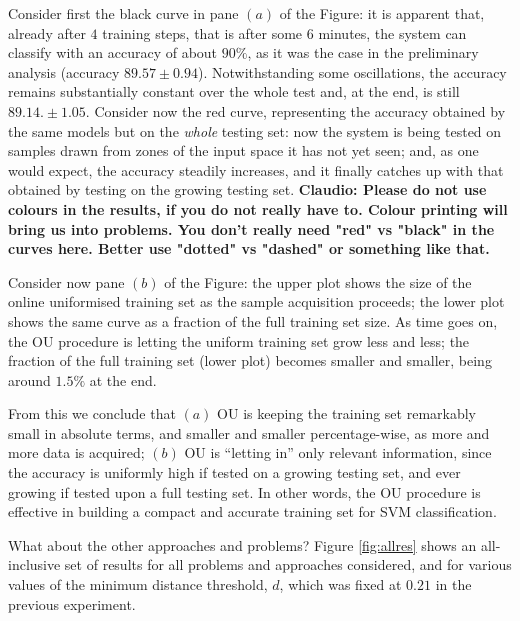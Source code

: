 Consider first the black curve in pane $(a)$ of the Figure: it is
apparent that, already after $4$ training steps, that is after some
$6$ minutes, the system can classify with an accuracy of about $90\%$,
as it was the case in the preliminary analysis (accuracy $89.57 \pm
0.94$). Notwithstanding some oscillations, the accuracy remains
substantially constant over the whole test and, at the end, is still
$89.14. \pm 1.05$. Consider now the red curve, representing the
accuracy obtained by the same models but on the \emph{whole} testing
set: now the system is being tested on samples drawn from zones of the
input space it has not yet seen; and, as one would expect, the
accuracy steadily increases, and it finally catches up with that
obtained by testing on the growing testing set.
\textbf{Claudio:  Please do not use colours in the results, if you do not really have to.  Colour printing will bring us into problems.  You don't really need "red" vs "black"
in the curves here.  Better use "dotted" vs "dashed" or something like that.}

Consider now pane $(b)$ of the Figure: the upper plot shows the size
of the online uniformised training set as the sample acquisition
proceeds; the lower plot shows the same curve as a fraction of the
full training set size. As time goes on, the OU procedure is letting
the uniform training set grow less and less; the fraction of the full
training set (lower plot) becomes smaller and smaller, being around
$1.5\%$ at the end.

From this we conclude that $(a)$ OU is keeping the training set
remarkably small in absolute terms, and smaller and smaller
percentage-wise, as more and more data is acquired; $(b)$ OU is
``letting in'' only relevant information, since the accuracy is
uniformly high if tested on a growing testing set, and ever growing if
tested upon a full testing set. In other words, the OU procedure is
effective in building a compact and accurate training set for SVM
classification.

What about the other approaches and problems? Figure \ref{fig:allres}
shows an all-inclusive set of results for all problems and approaches
considered, and for various values of the minimum distance threshold,
$d$, which was fixed at $0.21$ in the previous experiment.

